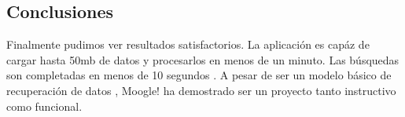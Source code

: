 \documentclass{article}
\begin{document}
\begin{center}
\begin{flushleft}
			
	
		
	\section{Conclusiones}
	
	Finalmente pudimos ver resultados satisfactorios. La aplicación es capáz de cargar hasta 50mb de datos y procesarlos en menos de un minuto. Las búsquedas son completadas en menos de 10 segundos . A pesar de ser un modelo básico de recuperación de datos , Moogle! ha demostrado ser un proyecto tanto instructivo como funcional. 
		
		
		
	\end{flushleft}	
	\end{center}
\end{document}
